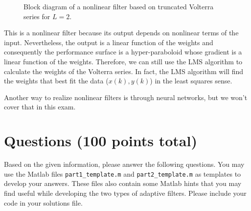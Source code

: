 \documentclass[10pt]{article}
\begin{document}
\begin{figure}[t!]
	\centering
	\resizebox{\linewidth}{!}{}
	\caption{Block diagram of a nonlinear filter based on truncated Volterra series for $L = 2$.} \label{fig:volterra-diagram}
\end{figure}

This is a nonlinear filter because its output depends on nonlinear terms of the input. Nevertheless, the output is a linear function of the weights and consequently the performance surface is a hyper-paraboloid whose gradient is a linear function of the weights. Therefore, we can still use the LMS algorithm to calculate the weights of the Volterra series. In fact, the LMS algorithm will find the weights that best fit the data ($x(k), y(k)$) in the least squares sense. 

Another way to realize nonlinear filters is through neural networks, but we won't cover that in this exam.

\pagebreak

\section*{Questions (100 points total)} Based on the given information, please answer the following questions. You may use the Matlab files \texttt{part1\_template.m} and \texttt{part2\_template.m} as templates to develop your answers. These files also contain some Matlab hints that you may find useful while developing the two types of adaptive filters. Please include your code in your solutions file.
\end{document}
